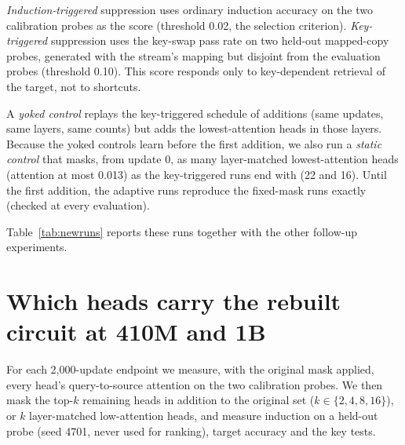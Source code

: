 \emph{Induction-triggered} suppression uses ordinary induction accuracy on the two
calibration probes as the score (threshold 0.02, the selection criterion).
\emph{Key-triggered} suppression uses the key-swap pass rate on two held-out
mapped-copy probes, generated with the stream's mapping but disjoint from the
evaluation probes (threshold 0.10). This score responds only to key-dependent
retrieval of the target, not to shortcuts.

A \emph{yoked control} replays the key-triggered schedule of additions (same
updates, same layers, same counts) but adds the lowest-attention heads in those
layers. Because the yoked controls learn before the first addition, we also run a
\emph{static control} that masks, from update 0, as many layer-matched
lowest-attention heads (attention at most 0.013) as the key-triggered runs end with
(22 and 16). Until the first addition, the adaptive runs reproduce the fixed-mask
runs exactly (checked at every evaluation).

Table~\ref{tab:newruns} reports these runs together with the other follow-up
experiments.

\begin{table}[!htbp]
\centering\small
\caption{All follow-up runs (streams 38/39; learning rate $3\times10^{-5}$; values are
stream 38 / stream 39). \emph{Heads} is the number of suppressed heads at the end.
\emph{First learned} uses the full key-dependent criterion, evaluated every 50
updates (every 100 for the 10,000-update runs). \emph{Masked induction} is ordinary
induction at the end with the run's final mask applied.}
\label{tab:newruns}
\setlength{\tabcolsep}{3pt}
\end{table}

\section{Which heads carry the rebuilt circuit at 410M and 1B}
\label{app:regrowth}
For each 2,000-update endpoint we measure, with the original mask applied, every
head's query-to-source attention on the two calibration probes. We then mask the
top-$k$ remaining heads in addition to the original set ($k\in\{2,4,8,16\}$), or
$k$ layer-matched low-attention heads, and measure induction on a held-out probe
(seed 4701, never used for ranking), target accuracy and the key tests.

